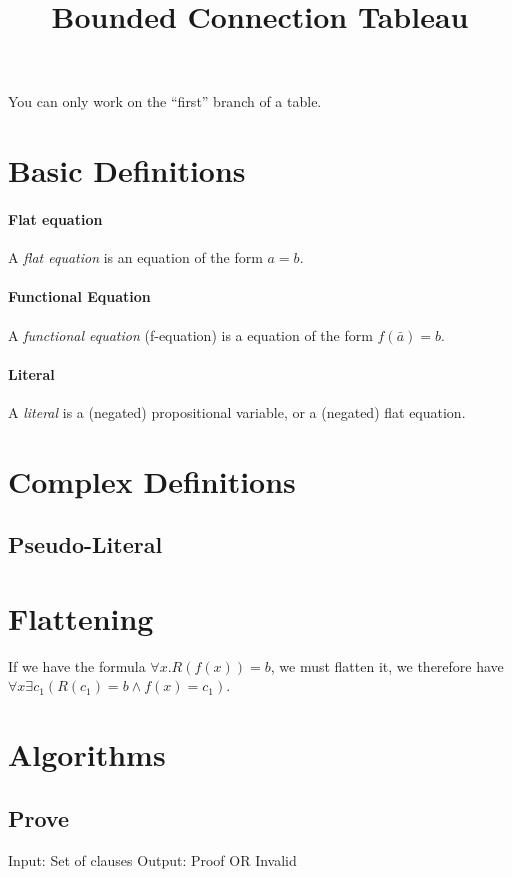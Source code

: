 \documentclass{article}
\title{Bounded Connection Tableau}
\begin{document}
\maketitle

You can only work on the ``first'' branch of a table.

\section{Basic Definitions}

\paragraph{Flat equation} A \emph{flat equation} is an equation of the form $a = b$.

\paragraph{Functional Equation} A \emph{functional equation} (f-equation) is a equation of the form $f(\bar{a}) = b$.

\paragraph{Literal} A \emph{literal} is a (negated) propositional variable, or a (negated) flat equation.

\section{Complex Definitions}

\subsection{Pseudo-Literal}



\section{Flattening}
If we have the formula $\forall x . R(f(x)) = b$, we must flatten it, we therefore have $\forall x \exists c_1 (R(c_1) = b \wedge f(x) = c_1)$.


\section{Algorithms}

\subsection{Prove}
Input: Set of clauses
Output: Proof OR Invalid
\end{document}
